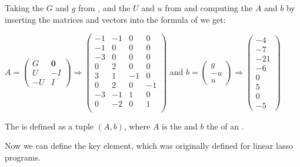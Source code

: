 \begin{example}
	Taking the \guardmatrix $G$ and \guardconstants $g$ from , and the \guardmatrix $U$ and \updateconstants $u$ from  and computing the \iterationmatrix $A$ and \iterationconstants $b$ by inserting the matrices and vectors into the formula of  we get: \newline
	\begin{center}
		$A = \begin{pmatrix} G & \textbf{0} \\ U & -I \\ -U & I \end{pmatrix} \Rightarrow 
		\begin{pmatrix} 
			-1 & -1 & 0 & 0 \\
			-1 & 0 & 0 & 0 \\
			-3 & 0 & 0 & 0\\
			0 & 2 & 0 & 0 \\
			3 & 1 & -1 & 0 \\
			0 & 2 & 0 & -1 \\
			-3 & -1 & 1 & 0 \\
			0 & -2 & 0 & 1 \\
		\end{pmatrix}$ and 
		$b = \begin{pmatrix} g \\ -u \\ u \end{pmatrix} \Rightarrow \begin{pmatrix}
			-4 \\ -7 \\-21\\-6\\ 0 \\ 5 \\ 0 \\ -5
		\end{pmatrix}$
	\end{center}
\end{example}

\begin{definition}[LOOP]
	The \loopt is defined as a tuple $(A, b)$, where $A$ is the \iterationmatrix and $b$ the \iterationconstants of an \its.
\end{definition}

Now we can define the key element, which was originally defined for linear lasso programs. 

